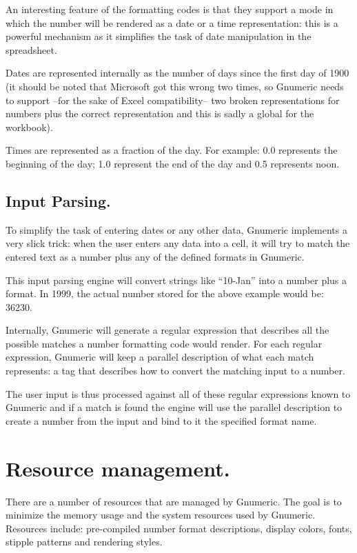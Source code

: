 \documentclass[12pt,twoside,twocolumn]{article}
\begin{document}
An interesting feature of the formatting codes is that they support a
mode in which the number will be rendered as a date or a time
representation: this is a powerful mechanism as it simplifies the task
of date manipulation in the spreadsheet.

Dates are represented internally as the number of days since the first
day of 1900 (it should be noted that Microsoft got this wrong two
times, so Gnumeric needs to support --for the sake of Excel
compatibility-- two broken representations for numbers plus the
correct representation and this is sadly a global for the workbook).

Times are represented as a fraction of the day.  For example: 0.0
represents the beginning of the day; 1.0 represent the end of the day
and 0.5 represents noon. 

\subsection{Input Parsing.}

To simplify the task of entering dates or any other data, Gnumeric
implements a very slick trick: when the user enters any data into a
cell, it will try to match the entered text as a number plus any of
the defined formats in Gnumeric.

This input parsing engine will convert strings like ``10-Jan'' 
into a number plus a format.  In 1999, the actual number stored for
the above example would be: 36230. 

Internally, Gnumeric will generate a regular expression that describes
all the possible matches a number formatting code would render.
For each regular expression, Gnumeric will keep a parallel description
of what each match represents: a tag that describes how to convert the
matching input to a number.

The user input is thus processed against all of these regular
expressions known to Gnumeric and if a match is found the engine will
use the parallel description to create a number from the input and bind
to it the specified format name.

\section{Resource management.}

There are a number of resources that are managed by Gnumeric.  The
goal is to minimize the memory usage and the system resources used by
Gnumeric.   Resources include: pre-compiled number format
descriptions, display colors, fonts, stipple patterns and rendering
styles. 
\end{document}

